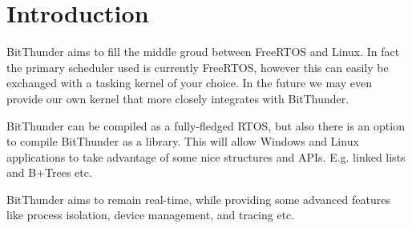 \section{Introduction}

BitThunder aims to fill the middle groud between FreeRTOS and Linux. In fact the primary
scheduler used is currently FreeRTOS, however this can easily be exchanged with a tasking
kernel of your choice. In the future we may even provide our own kernel that more closely
integrates with BitThunder.

BitThunder can be compiled as a fully-fledged RTOS, but also there is an option to compile
BitThunder as a library. This will allow Windows and Linux applications to take advantage
of some nice structures and APIs. E.g. linked lists and B+Trees etc.

BitThunder aims to remain real-time, while providing some advanced features like
process isolation, device management, and tracing etc.

\newpage



